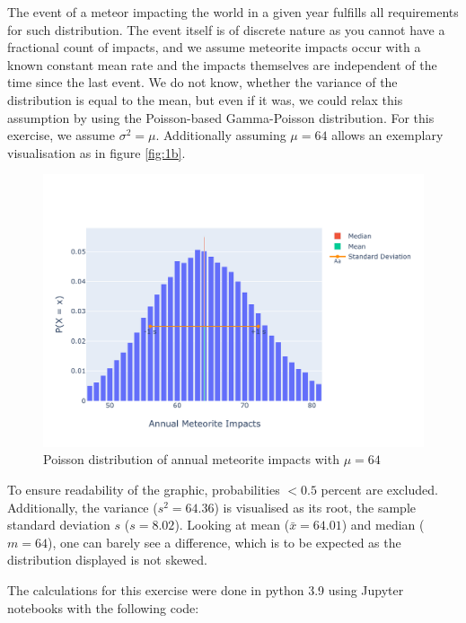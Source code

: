The event of a meteor impacting the world in a given year fulfills all requirements for such distribution. The event itself is of discrete nature as you cannot have a fractional count of impacts, and we assume meteorite impacts occur with a known constant mean rate and the impacts themselves are independent of the time since the last event. We do not know, whether the variance of the distribution is equal to the mean, but even if it was, we could relax this assumption by using the Poisson-based Gamma-Poisson distribution. For this exercise, we assume $\sigma^2 = \mu$. Additionally assuming $\mu = 64$ allows an exemplary visualisation as in figure \eqref{fig:1b}.

\begin{figure}[h]
\centering
\includegraphics[width=16cm]{pics/1b.pdf}
\caption{Poisson distribution of annual meteorite impacts with $\mu = 64$}
\label{fig:1b}
\end{figure}
\FloatBarrier

To ensure readability of the graphic, probabilities $<0.5$ percent are excluded. Additionally, the variance ($s^2 = 64.36$) is visualised as its root, the sample standard deviation $s$ ($s = 8.02$). Looking at mean ($\bar{x} = 64.01$) and median ($m = 64$), one can barely see a difference, which is to be expected as the distribution displayed is not skewed. 

The calculations for this exercise were done in python 3.9 using Jupyter notebooks with the following code: 

